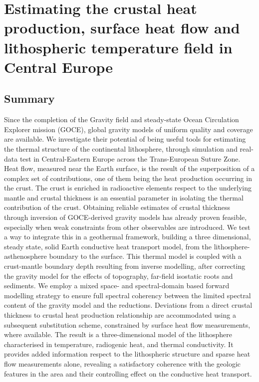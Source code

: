 \chapter{Estimating the crustal heat production, surface heat flow and lithospheric temperature field in Central Europe}
\label{c:ThermAppl}

\section*{Summary}
\label{s:Appl:Summary}
Since the completion of the Gravity field and steady-state Ocean Circulation Explorer mission (GOCE), global gravity models of uniform quality and coverage are available.
We investigate their potential of being useful tools for estimating the thermal structure of the continental lithosphere, through simulation and real-data test in Central-Eastern Europe across the Trans-European Suture Zone.
Heat flow, measured near the Earth surface, is the result of the superposition of a complex set of contributions, one of them being the heat production occurring in the crust.
The crust is enriched in radioactive elements respect to the underlying mantle and crustal thickness is an essential parameter in isolating the thermal contribution of the crust.
Obtaining reliable estimates of crustal thickness through inversion of GOCE-derived gravity models has already proven feasible, especially when weak constraints from other observables are introduced.
We test a way to integrate this in a geothermal framework, building a three dimensional, steady state, solid Earth conductive heat transport model, from the lithosphere-asthenosphere boundary to the surface.
This thermal model is coupled with a crust-mantle boundary depth resulting from inverse modelling, after correcting the gravity model for the effects of topography, far-field isostatic roots and sediments.
We employ a mixed space- and spectral-domain based forward modelling strategy to ensure full spectral coherency between the limited spectral content of the gravity model and the reductions.
Deviations from a direct crustal thickness to crustal heat production relationship are accommodated using a subsequent substitution scheme, constrained by surface heat flow measurements, where available.
The result is a three-dimensional model of the lithosphere characterised in temperature, radiogenic heat, and thermal conductivity.
It provides added information respect to the lithospheric structure and sparse heat flow measurements alone, revealing a satisfactory coherence with the geologic features in the area and their controlling effect on the conductive heat transport.

